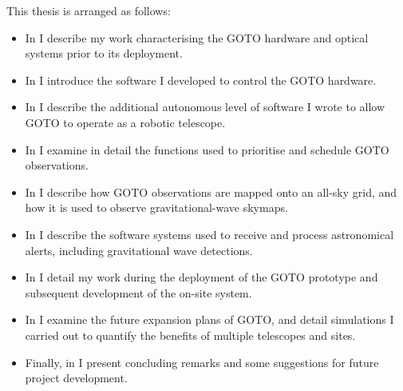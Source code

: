 \begin{colsection}
This thesis is arranged as follows:
%
\begin{itemize}
    \item In  I describe my work characterising the GOTO hardware and optical systems prior to its deployment.
    \item In  I introduce the software I developed to control the GOTO hardware.
    \item In  I describe the additional autonomous level of software I wrote to allow GOTO to operate as a robotic telescope.
    \item In  I examine in detail the functions used to prioritise and schedule GOTO observations.
    \item In  I describe how GOTO observations are mapped onto an all-sky grid, and how it is used to observe gravitational-wave skymaps.
    \item In  I describe the software systems used to receive and process astronomical alerts, including gravitational wave detections.
    \item In  I detail my work during the deployment of the GOTO prototype and subsequent development of the on-site system.
    \item In  I examine the future expansion plans of GOTO, and detail simulations I carried out to quantify the benefits of multiple telescopes and sites.
    \item Finally, in  I present concluding remarks and some suggestions for future project development.
\end{itemize}

\end{colsection}

